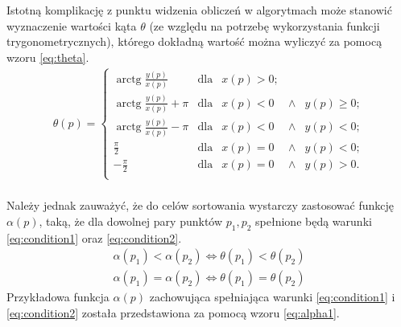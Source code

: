     	Istotną komplikację z punktu widzenia obliczeń  w algorytmach może stanowić wyznaczenie wartości kąta $\theta$ (ze względu na potrzebę wykorzystania funkcji trygonometrycznych), którego dokładną wartość można wyliczyć za pomocą wzoru \ref{eq:theta}.\\
        \begin{align}\label{eq:theta}
        	\theta\left(p\right) = \left\{
        		\begin{array}{lclcr}
        			\operatorname {arctg} \frac{y\left(p\right)}{x\left(p\right)}& \text{dla} & x\left(p\right) > 0; \\
        			\operatorname {arctg} \frac{y\left(p\right)}{x\left(p\right)} + \pi& \text{dla} & x\left(p\right) < 0 & \wedge & y\left(p\right) \geqslant 0; \\
        			\operatorname {arctg} \frac{y\left(p\right)}{x\left(p\right)} - \pi& \text{dla} & x\left(p\right) < 0 & \wedge & y\left(p\right) < 0; \\
        			\frac{\pi}{2}& \text{dla} & x\left(p\right) = 0 & \wedge & y\left(p\right) < 0; \\
        			-\frac{\pi}{2}& \text{dla} & x\left(p\right) = 0 & \wedge & y\left(p\right) > 0. \\
        		\end{array}
        	\right.
        \end{align}\\
         Należy jednak zauważyć, że do celów sortowania wystarczy zastosować funkcję $\alpha\left(p\right)$, taką, że dla dowolnej pary punktów $p_1, p_2$ spełnione będą warunki \ref{eq:condition1} oraz \ref{eq:condition2}. 
    	\begin{align}\label{eq:condition1}
    		\alpha\left(p_1\right) <  \alpha\left(p_2\right)
    		\Leftrightarrow \theta\left(p_1\right) <  \theta\left(p_2\right)\\
    		\label{eq:condition2}
    		\alpha\left(p_1\right) =  \alpha\left(p_2\right)
    		\Leftrightarrow \theta\left(p_1\right) = \theta\left(p_2\right)
    	\end{align}
		Przykładowa funkcja $\alpha\left(p\right)$ zachowująca spełniająca warunki \ref{eq:condition1} i \ref{eq:condition2} została przedstawiona za pomocą wzoru \ref{eq:alpha1}.\\
